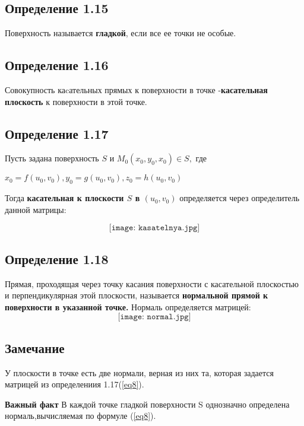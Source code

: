 \documentclass[12pt]{article}
\begin{document}
\subsection*{Определение 1.15 }

Поверхность называется \textbf{гладкой}, если все ее точки не особые.



\subsection*{Определение 1.16 }
Совокупность каcательных прямых к поверхности в точке -\textbf{касательная плоскость} к поверхности в этой точке.

\subsection*{Определение 1.17}
	
	Пусть задана поверхность $S$ и $M_0(x_0 , y_0 , x_0) \in S,  
$ где

$
x_0 = f(u_0 , v_0) , y_0 = g(u_0 , v_0) , 
z_0 = h(u_0 , v_0)$

Тогда \textbf{касательная к плоскости $S$ в $(u_0 , v_0)$} определяется через определитель данной матрицы:
\begin{center}
\begin{equation}
\texttt{[image: kasatelnya.jpg]}\label{eq7}
\end{equation}
\end{center}
\subsection*{Определение 1.18}
	Прямая, проходящая через точку касания поверхности с касательной плоскостью и перпендикулярная этой плоскости, называется \textbf{нормальной прямой к поверхности в указанной точке.}
	Нормаль определяется матрицей:
\begin{equation}
	\texttt{[image: normal.jpg]}\label{eq8}
\end{equation}
\subsection*{Замечание}
	У плоскости в точке есть две нормали, верная из них та, которая задается матрицей из определениия 1.17(\ref{eq8}).	
	
	
\textbf{Важный факт}
	В каждой точке гладкой поверхности S однозначно определена нормаль,вычисляемая по формуле (\ref{eq8}).
	
\end{document}
